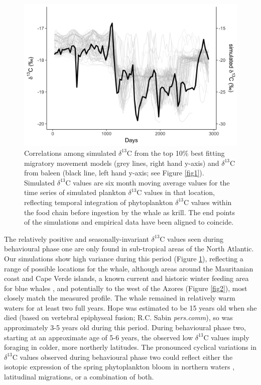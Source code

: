 \documentclass[9pt,twocolumn,twoside,lineno]{pnas-new}
\begin{document}
\begin{figure}
 \centering
  \includegraphics[width = \linewidth]{figures/Figure-3-blue-sims.png}
  \caption{Correlations among simulated $\delta^{13}$C from the top 10\% best fitting migratory movement models (grey lines, right hand y-axis) and $\delta^{13}$C from baleen (black line, left hand y-axis; see Figure \ref{fig1}). 
  Simulated $\delta^{13}$C values are six month moving average values for the time series of simulated plankton $\delta^{13}$C values in that location, reflecting temporal integration of phytoplankton $\delta^{13}$C values within the food chain before ingestion by the whale as krill. 
  The end points of the simulations and empirical data have been aligned to coincide.
}
  \label{fig3}
\end{figure}
 
The relatively positive and seasonally-invariant $\delta^{13}$C values seen during behavioural phase one are only found in sub-tropical areas of the North Atlantic.  
Our simulations show high variance during this period (Figure \ref{fig3}), reflecting a range of possible locations for the whale, although areas around the Mauritanian coast and Cape Verde islands, a known current and historic winter feeding area for blue whales  \cite{baines2014upwellings,reeves2004historical}, and potentially to the west of the Azores (Figure \ref{fig2}), most closely match the measured profile. 
The whale remained in relatively warm waters for at least two full years. 
Hope was estimated to be 15 years old when she died (based on vertebral epiphyseal fusion; R.C. Sabin \textit{pers.comm}), so was approximately 3-5 years old during this period.
During behavioural phase two, starting at an approximate age of 5-6 years, the observed low $\delta^{13}$C values imply foraging in colder, more northerly latitudes. 
The pronounced cyclical variations in $\delta^{13}$C values observed during behavioural phase two could reflect either the isotopic expression of the spring phytoplankton bloom in northern waters \cite{magozzi2017using}, latitudinal migrations, or a combination of both.  
\end{document}
